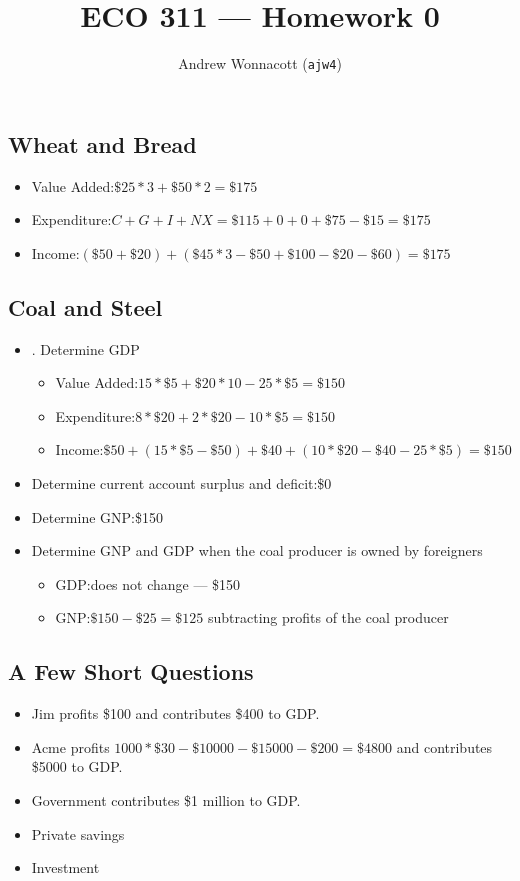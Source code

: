 \documentclass{pset}
\title{ECO 311 --- Homework 0}
\author{Andrew Wonnacott (\texttt{ajw4})}
\begin{document}
\maketitle
\subsection{Wheat and Bread}
\begin{itemize}
\item Value Added:\@ \( \$25*3 + \$50*2 = \$175 \)
\item Expenditure:\@ \( C + G + I + NX = \$115 + 0 + 0 + \$75 - \$15 = \$175 \)
\item Income:\@ \( (\$50 + \$20) + (\$45 * 3 - \$50 + \$100 - \$20 - \$60) = \$175 \)
\end{itemize}
\subsection{Coal and Steel}
\begin{itemize}
\item. Determine GDP
  \begin{itemize}
    \item Value Added:\@ \( 15*\$5 + \$20*10-25*\$5= \$150 \)
    \item Expenditure:\@ \( 8 * \$20 + 2 * \$20 - 10 * \$5 = \$150 \)
    \item Income:\@ \( \$50 + (15 * \$5 - \$50) + \$40 + (10 * \$20 - \$40 - 25 * \$5) = \$150\)
    \end{itemize}
  \item Determine current account surplus and deficit:\@ \$0
  \item Determine GNP:\@ \$150
  \item Determine GNP and GDP when the coal producer is owned by foreigners
    \begin{itemize}
    \item GDP:\@ does not change --- \$150
    \item GNP:\@ \( \$150 - \$25 = \$125 \) subtracting profits of the coal producer
    \end{itemize}
\end{itemize}
\subsection{A Few Short Questions}
\begin{itemize}
\item Jim profits \$100 and contributes \$400 to GDP.\@
\item Acme profits \( 1000*\$30-\$10000-\$15000-\$200 = \$4800\) and contributes \$5000 to GDP.\@
\item Government contributes \$1 million to GDP.\@
\item Private savings
\item Investment
\end{itemize}
\end{document}

